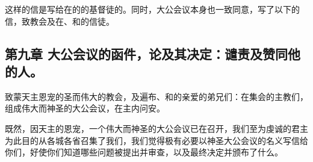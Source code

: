 这样的信是写给在的的基督徒的。同时，大公会议本身也一致同意，写了以下的信，致教会及在、和的信徒。\par


\subsection{第九章 大公会议的函件，论及其决定：谴责及赞同他的人。}

致蒙天主恩宠的圣而伟大的教会，及遍布、和的亲爱的弟兄们：在集会的主教们，组成伟大而神圣的大公会议，在主内问安。\par

既然，因天主的恩宠，一个伟大而神圣的大公会议已在召开，我们至为虔诚的君主为此目的从各城各省召集了我们，我们觉得极有必要以神圣大公会议的名义写信给你们，好使你们知道哪些问题被提出并审查，以及最终决定并颁布了什么。\par

